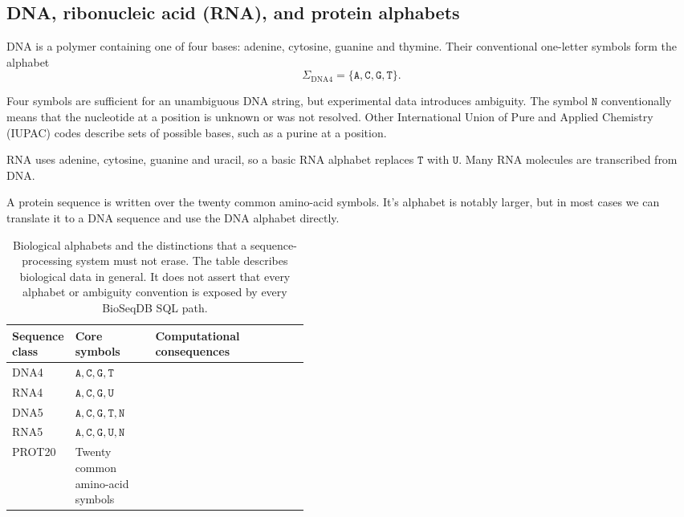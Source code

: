 \subsection{DNA, ribonucleic acid (RNA), and protein alphabets}

DNA is a polymer containing one of four bases:
adenine, cytosine, guanine and thymine. Their conventional one-letter symbols
form the alphabet
\[
  \Sigma_{\mathrm{DNA4}} =
  \{\mathtt{A},\mathtt{C},\mathtt{G},\mathtt{T}\}.
\]

Four symbols are sufficient for an unambiguous DNA string, but experimental
data introduces ambiguity. The symbol \(\mathtt{N}\) conventionally means
that the nucleotide at a position is unknown or was not resolved. Other
International Union of Pure and Applied Chemistry (IUPAC) codes describe sets
of possible bases, such as a purine at a position.

RNA uses adenine, cytosine, guanine and uracil, so a basic RNA alphabet replaces
\(\mathtt{T}\) with \(\mathtt{U}\). Many RNA molecules are transcribed from
DNA. \cite{crick_central_dogma_1970}

A protein sequence is written over the twenty common amino-acid symbols. It's alphabet is notably larger, but in most cases we can translate it to a DNA sequence and use the DNA alphabet directly.

\begin{table}[ht]
  \centering
  \small
  \setlength{\tabcolsep}{4pt}
  \begin{tabularx}{\linewidth}{
      @{}
      >{\raggedright\arraybackslash}p{0.16\linewidth}
      >{\raggedright\arraybackslash}p{0.27\linewidth}
      >{\raggedright\arraybackslash}X
      @{}
    }
    \toprule
    Sequence class & Core symbols & Computational consequences \\
    \midrule
    DNA4 &
    \(\mathtt{A,C,G,T}\) \\
    RNA4 &
    \(\mathtt{A,C,G,U}\) \\
    DNA5 &
    \(\mathtt{A,C,G,T,N}\) \\
    RNA5 &
    \(\mathtt{A,C,G,U,N}\) \\
    PROT20 &
    Twenty common amino-acid symbols \\
    \bottomrule
  \end{tabularx}
  \caption{Biological alphabets and the distinctions that a sequence-processing
    system must not erase. The table describes biological data in general. It
    does not assert that every alphabet or ambiguity convention is exposed by
    every BioSeqDB SQL path.}
  \label{tab:biological-alphabets}
\end{table}

